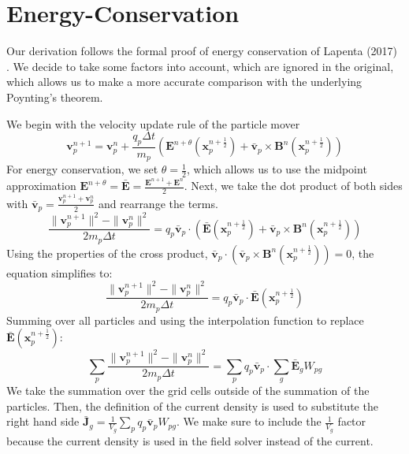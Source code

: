 \chapter{Energy-Conservation}
\label{app: regular grid}
Our derivation follows the formal proof of energy conservation of Lapenta (2017) \cite{lapenta_exactly_2017}. We decide to take some factors into account, which are ignored in the original, which allows us to make a more accurate comparison with the underlying Poynting's theorem.

We begin with the velocity update rule of the particle mover
\begin{equation}
    \textbf{v}_p^{n+1} = \textbf{v}_p^n + \frac{q_p \Delta t}{m_p}\left(\textbf{E}^{n+\theta}(\textbf{x}_p^{n+\frac{1}{2}}) + \bar{\textbf{v}}_p \times \textbf{B}^n(\textbf{x}_p^{n+\frac{1}{2}})\right)
\end{equation}
For energy conservation, we set $\theta = \frac{1}{2}$, which allows us to use the midpoint approximation $\textbf{E}^{n+\theta} = \bar{\textbf{E}} = \frac{\textbf{E}^{n+1} + \textbf{E}^{n}}{2}$. Next, we take the dot product of both sides with $\bar{\textbf{v}}_p = \frac{\textbf{v}^{n+1}_p + \textbf{v}_p^{n}}{2}$ and rearrange the terms.
\begin{equation}
    \frac{\|\textbf{v}_p^{n+1}\|^2 - \|\textbf{v}_p^{n}\|^2}{2 m_p \Delta t}= q_p \bar{\textbf{v}}_p \cdot \left(\bar{\textbf{E}}(\textbf{x}_p^{n+\frac{1}{2}}) + \bar{\textbf{v}}_p \times \textbf{B}^n(\textbf{x}_p^{n+\frac{1}{2}})\right)
\end{equation}
Using the properties of the cross product, $\bar{\textbf{v}}_p \cdot (\bar{\textbf{v}}_p \times \textbf{B}^n(\textbf{x}_p^{n+\frac{1}{2}})) = 0$, the equation simplifies to:
\begin{equation}
    \frac{\|\textbf{v}_p^{n+1}\|^2 - \|\textbf{v}_p^{n}\|^2}{2 m_p \Delta t}= q_p \bar{\textbf{v}}_p \cdot \bar{\textbf{E}}(\textbf{x}_p^{n+\frac{1}{2}})
\end{equation}
Summing over all particles and using the interpolation function to replace $\bar{\textbf{E}}(\textbf{x}_p^{n+\frac{1}{2}})$:
\begin{equation}
     \sum_p \frac{\|\textbf{v}_p^{n+1}\|^2 - \|\textbf{v}_p^{n}\|^2}{2 m_p \Delta t}= \sum_p q_p \bar{\textbf{v}}_p \cdot \sum_g \bar{\textbf{E}}_g W_{pg}
\end{equation}
We take the summation over the grid cells outside of the summation of the particles. Then, the definition of the current density is used to substitute the right hand side $\bar{\textbf{J}}_g = \frac{1}{V_g} \sum_p q_p \bar{\textbf{v}}_p W_{pg}$. We make sure to include the $\frac{1}{V_g}$ factor because the current density is used in the field solver instead of the current.
